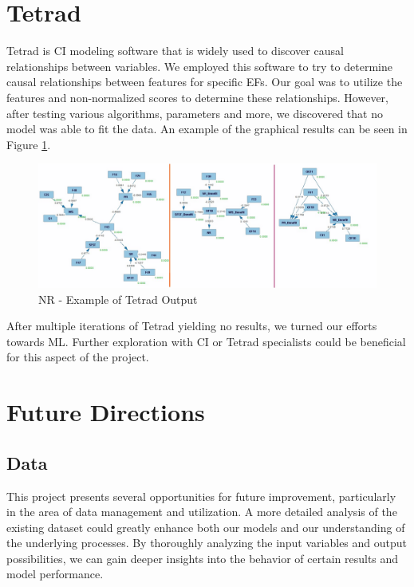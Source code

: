 \documentclass[12pt,letterpaper]{article}
\begin{document}
\section{Tetrad}
Tetrad is \ac{CI} modeling software that is widely used to discover causal relationships between variables.
We employed this software to try to determine causal relationships between features for specific \ac{EF}s.
Our goal was to utilize the features and non-normalized scores to determine these relationships.
However, after testing various algorithms, parameters and more, we discovered that no model was able to fit the data.
An example of the graphical results can be seen in Figure \ref{fig:tetrad}.

\begin{figure}[b]
    \centering
    \includegraphics[width=0.95\linewidth]{tetrad/ex1.jpg}
    \caption{NR - Example of Tetrad Output}
    \label{fig:tetrad}
\end{figure}

After multiple iterations of Tetrad yielding no results, we turned our efforts towards \ac{ML}.
Further exploration with \ac{CI} or Tetrad specialists could be beneficial for this aspect of the project.




\section{Future Directions}
\subsection{Data}

This project presents several opportunities for future improvement, particularly in the area of data management and utilization. 
A more detailed analysis of the existing dataset could greatly enhance both our models and our understanding of the underlying processes.
By thoroughly analyzing the input variables and output possibilities, we can gain deeper insights into the behavior of certain results and model performance.
\end{document}
